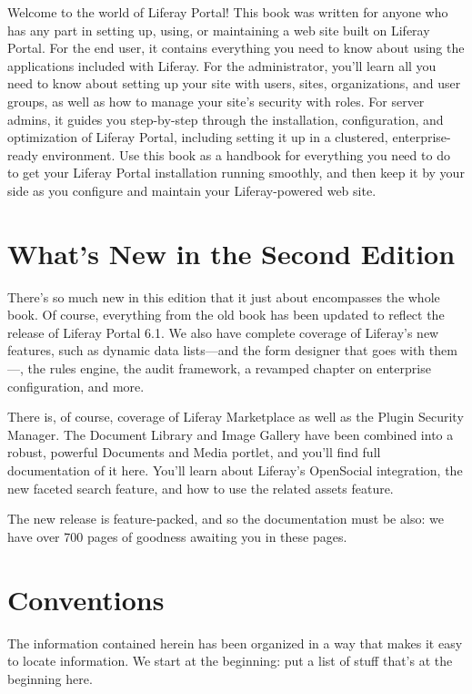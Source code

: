 \documentclass[9pt,openright,twoside]{memoir}
\begin{document}
Welcome to the world of Liferay Portal! This book was written for anyone who has
any part in setting up, using, or maintaining a web site built on Liferay
Portal. For the end user, it contains everything you need to know about using
the applications included with Liferay. For the administrator, you'll learn all
you need to know about setting up your site with users, sites, organizations,
and user groups, as well as how to manage your site's security with roles. For
server admins, it guides you step-by-step through the installation,
configuration, and optimization of Liferay Portal, including setting it up in a
clustered, enterprise-ready environment. Use this book as a handbook for
everything you need to do to get your Liferay Portal installation running
smoothly, and then keep it by your side as you configure and maintain your
Liferay-powered web site.

\section{What's New in the Second Edition}

There's so much new in this edition that it just about encompasses the whole
book. Of course, everything from the old book has been updated to reflect
the release of Liferay Portal 6.1. We also have complete coverage of Liferay's
new features, such as dynamic data lists---and the form designer that goes with
them---, the rules engine, the audit framework, a revamped chapter on enterprise
configuration, and more. 

There is, of course, coverage of Liferay Marketplace as well as the Plugin
Security Manager. The Document Library and Image Gallery have been combined into
a robust, powerful Documents and Media portlet, and you'll find full
documentation of it here. You'll learn about Liferay's OpenSocial integration,
the new faceted search feature, and how to use the related assets feature. 

The new release is feature-packed, and so the documentation must be also: we
have over 700 pages of goodness awaiting you in these pages. 

\section{Conventions}

The information contained herein has been organized in a way that makes it easy
to locate information. We start at the beginning: put a list of stuff that's at
the beginning here. 
\end{document}
